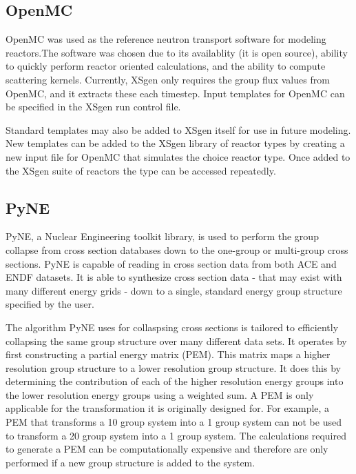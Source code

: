 \documentclass{article}
\begin{document}
\subsection{OpenMC}
OpenMC was used as the reference neutron transport software for modeling reactors.The software was chosen due to its availablity (it is open source), ability to quickly perform
reactor oriented calculations\cite{serpentvmonte}, and the ability to compute scattering kernels. Currently, XSgen only requires the group flux values from OpenMC, and it extracts these each timestep. Input templates for OpenMC can be specified in the XSgen run control file.

Standard templates may also be added to XSgen itself for use in future modeling. New templates can be added to the XSgen library of reactor types by creating a new input file for OpenMC that simulates the choice reactor type. Once added to the XSgen suite of reactors the type can be accessed repeatedly.

\subsection{PyNE}
PyNE, a Nuclear Engineering toolkit library, is used to perform the group collapse
from cross section databases down to the one-group or multi-group cross sections.
PyNE is capable of reading in cross section data from both ACE\cite{ace} and ENDF\cite{endf}
datasets. It is able to synthesize cross section data - that may exist with
many different energy grids - down to a single, standard energy group structure specified
by the user.

The algorithm PyNE uses for collaspsing cross sections is tailored to efficiently collapsing
the same group structure over many different data sets.
It operates by first constructing a partial energy matrix (PEM). This matrix maps a higher
resolution group structure to a lower resolution group structure. It does this by determining
the contribution of each of the higher resolution energy groups into the lower resolution
energy groups using a weighted sum. A PEM is only applicable for the transformation it is
originally designed for. For example, a PEM that transforms a 10 group system into a
1 group system can not be used to transform a 20 group system into a 1 group system.
The calculations required to generate a PEM can be computationally expensive
and therefore are only performed if a new group structure is added to the system.
\end{document}
